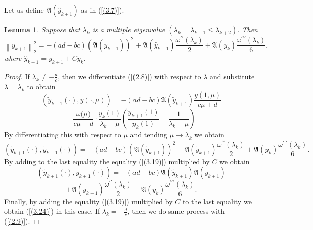\documentclass[10pt,a4paper]{amsart}
\newtheorem{lem}[thm]{Lemma}
\numberwithin{equation}{section}
\begin{document}
Let us define 
$\mathfrak{A}(\hat{y}_{k+1})$ as in (\ref{(3.7)}).

\begin{lem} Suppose that  $\lambda _{k}$ is a multiple eigenvalue \((\lambda_{k}=\lambda_{k+1} \le\lambda_{k+2})\).
Then 
\begin{equation}
{\left\| {y_{k+1}} \right\|}^{2}_{2} = - (ad - bc)(\mathfrak{A}(y_{k+1}))^2+\mathfrak{A}(\hat{y}_{k+1})\frac{\omega^{\prime\prime}(\lambda_k)}{2}+\mathfrak{A}(y_k)\frac{\omega^{\prime\prime\prime}(\lambda_k)}{6}, \label{(3.24)}
\end{equation}
where $\hat{y}_{k+1}={y}_{k+1}+Cy_k$.
\end{lem}

\begin{proof}
If $\lambda_k\neq-\frac{d}{c}$, then we differentiate (\ref{(2.8)}) with respect to $\lambda$ and substitute $\lambda=\lambda_k$ to obtain 
$$
\left(\tilde{y}_{k+1}(\cdot), y(\cdot,\mu)\right)
= -(ad - bc)\mathfrak{A}(\tilde{y}_{k+1})\frac{{y(1,\mu)}}{c{\mu} + d}
$$
\begin{equation}
- \frac{\omega{(\mu})}{{c\mu+d}} \cdot \frac{y_k(1)}{\lambda_k-{\mu}}\left(\frac{{\tilde{y}_{k+1}(1)}}{y_k(1)}-\frac{1}{\lambda_k-{\mu}} \right)
\label{(3.25)}
\end{equation}
By differentiating this with respect to $\mu$ and tending $\mu\to\lambda_k$ we obtain
\begin{equation}
\left(\tilde{y}_{k+1}(\cdot),\tilde{y}_{k+1}(\cdot)\right)
= -(ad - bc)(\mathfrak{A}(\tilde{y}_{k+1}))^2+\mathfrak{A}(\tilde{y}_{k+1})\frac{\omega^{\prime\prime}(\lambda_k)}{2}+\mathfrak{A}(y_k)\frac{\omega^{\prime\prime\prime}(\lambda_k)}{6}.\label{(3.26)}
\end{equation}
By adding to the last equality the equality (\ref{(3.19)}) multiplied by $C$ we obtain 
$$
\left(\tilde{y}_{k+1}(\cdot),{y}_{k+1}(\cdot)\right)
= -(ad - bc)\mathfrak{A}(\tilde{y}_{k+1})\mathfrak{A}({y}_{k+1})
$$
\begin{equation}
+\mathfrak{A}({y}_{k+1})\frac{\omega^{\prime\prime}(\lambda_k)}{2}+\mathfrak{A}(y_k)\frac{\omega^{\prime\prime\prime}(\lambda_k)}{6}.\label{(3.27)}
\end{equation}
Finally, by adding the equality (\ref{(3.19)}) multiplied by $C$  to the last equality we obtain (\ref{(3.24)}) in this case. If $\lambda_k=-\frac{d}{c}$, then we do same process with (\ref{(2.9)}).
\end{proof}
\end{document}
